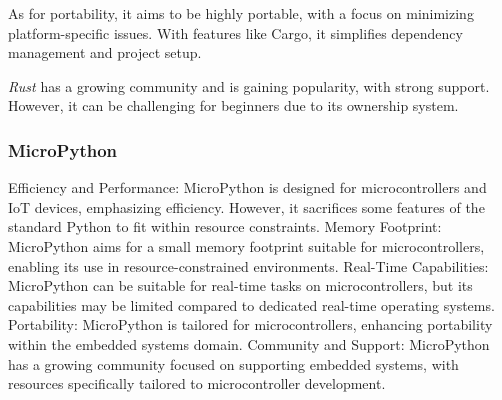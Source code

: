 As for portability, it aims to be highly portable, with a focus on minimizing platform-specific issues.
With features like Cargo, it simplifies dependency management and project setup.

\textit{Rust} has a growing community and is gaining popularity, with strong support.
However, it can be challenging for beginners due to its ownership system.

\subsubsection{MicroPython}
Efficiency and Performance: MicroPython is designed for microcontrollers and IoT devices, emphasizing efficiency. However, it sacrifices some features of the standard Python to fit within resource constraints.
Memory Footprint: MicroPython aims for a small memory footprint suitable for microcontrollers, enabling its use in resource-constrained environments.
Real-Time Capabilities: MicroPython can be suitable for real-time tasks on microcontrollers, but its capabilities may be limited compared to dedicated real-time operating systems.
Portability: MicroPython is tailored for microcontrollers, enhancing portability within the embedded systems domain.
Community and Support: MicroPython has a growing community focused on supporting embedded systems, with resources specifically tailored to microcontroller development.


